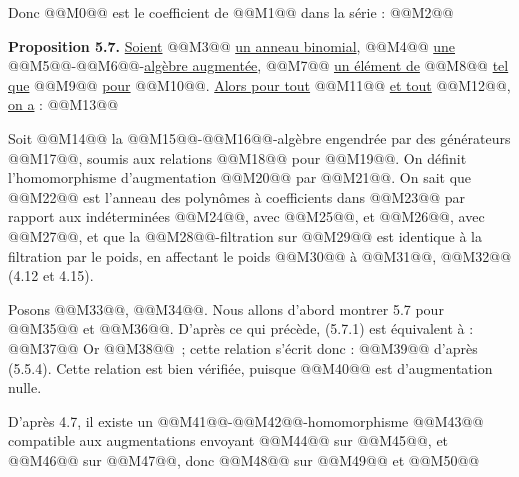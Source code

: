 

Donc @@M0@@ est le coefficient de @@M1@@ dans la série :
@@M2@@

\textbf{Proposition 5.7.} \uline{Soient} @@M3@@ \uline{un anneau binomial}, @@M4@@ \uline{une} @@M5@@-@@M6@@-\uline{algèbre augmentée}, @@M7@@ \uline{un élément de} @@M8@@ \uline{tel que} @@M9@@ \uline{pour} @@M10@@. \uline{Alors pour tout} @@M11@@ \uline{et tout} @@M12@@, \uline{on a} :
@@M13@@

Soit @@M14@@ la @@M15@@-@@M16@@-algèbre engendrée par des générateurs @@M17@@, soumis aux relations @@M18@@ pour @@M19@@. On définit l'homomorphisme d'augmentation @@M20@@ par @@M21@@. On sait que @@M22@@ est l'anneau des polynômes à coefficients dans @@M23@@ par rapport aux indéterminées @@M24@@, avec @@M25@@, et @@M26@@, avec @@M27@@, et que la @@M28@@-filtration sur @@M29@@ est identique à la filtration par le poids, en affectant le poids @@M30@@ à @@M31@@, @@M32@@ (4.12 et 4.15).

Posons @@M33@@, @@M34@@. Nous allons d'abord montrer 5.7 pour @@M35@@ et @@M36@@. D'après ce qui précède, (5.7.1) est équivalent à :
@@M37@@
Or @@M38@@~; cette relation s'écrit donc :
@@M39@@
d'après (5.5.4). Cette relation est bien vérifiée, puisque @@M40@@ est d'augmentation nulle.

D'après 4.7, il existe un @@M41@@-@@M42@@-homomorphisme @@M43@@ compatible aux augmentations envoyant @@M44@@ sur @@M45@@, et @@M46@@ sur @@M47@@, donc @@M48@@ sur @@M49@@ et @@M50@@ 

